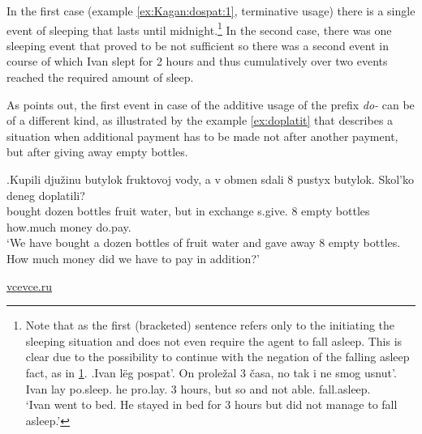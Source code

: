 In the first case (example \ref{ex:Kagan:dospat:1}, terminative usage) there is a single event of sleeping that lasts until midnight.\footnote{Note that as the first (bracketed) sentence refers only to the initiating the sleeping situation and does not even require the agent to fall asleep. This is clear due to the possibility to continue with the negation of the falling asleep fact, as in \ref{ex:dospat:no}.
\exg.\label{ex:dospat:no}Ivan l\"{e}g pospat'. On prole\v{z}al 3 \v{c}asa, no tak i ne smog usnut'.\\
Ivan lay po.sleep. he pro.lay. 3 hours, but so and not able. fall.asleep.\\
\vspace{0.5em}
`Ivan went to bed. He stayed in bed for 3 hours but did not manage to fall asleep.'

} In the second case, there was one sleeping event that proved to be not sufficient so there was a second event in course of which Ivan slept for 2 hours and thus cumulatively over two events reached the required amount of sleep. 

As \citet[80]{Kagan:book} points out, the first event in case of the additive usage of the prefix \textit{do-} can be of a different kind, as illustrated by the example \ref{ex:doplatit} that describes a situation when additional payment has to be made not after another payment, but after giving away empty bottles.

\exg.\label{ex:doplatit}Kupili dju\v{z}inu butylok fruktovoj vody, a v obmen sdali 8 pustyx butylok. Skol'ko deneg doplatili?\\
bought dozen bottles fruit water, but in exchange s.give. 8 empty bottles how.much money do.pay.\\
\vspace{0.5em}
`We have bought a dozen bottles of fruit water and gave away 8 empty bottles. How much money did we have to pay in addition?'
\begin{flushright}
\vspace{-0.5em}
\url{vcevce.ru}
\end{flushright}


